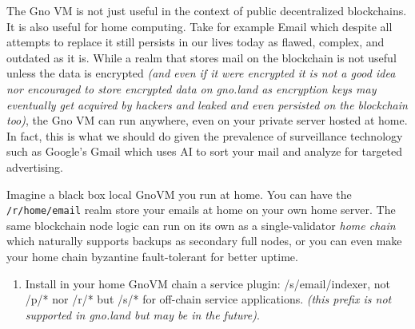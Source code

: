 \documentclass[12pt,a4paper]{article}
\providecommand{\tightlist}{\setlength{\itemsep}{0pt}\setlength{\parskip}{0pt}}
\newcommand{\passthrough}[1]{#1}
\begin{document}
The Gno VM is not just useful in the context of public decentralized
blockchains. It is also useful for home computing. Take for example
Email which despite all attempts to replace it still persists in our
lives today as flawed, complex, and outdated as it is. While a realm
that stores mail on the blockchain is not useful unless the data is
encrypted \emph{(and even if it were encrypted it is not a good idea nor
encouraged to store encrypted data on gno.land as encryption keys may
eventually get acquired by hackers and leaked and even persisted on the
blockchain too)}, the Gno VM can run anywhere, even on your private
server hosted at home. In fact, this is what we should do given the
prevalence of surveillance technology such as Google's Gmail which uses
AI to sort your mail and analyze for targeted advertising.

Imagine a black box local GnoVM you run at home. You can have the
\passthrough{\lstinline!/r/home/email!} realm store your emails at home
on your own home server. The same blockchain node logic can run on its
own as a single-validator \emph{home chain} which naturally supports
backups as secondary full nodes, or you can even make your home chain
byzantine fault-tolerant for better uptime.

\begin{enumerate}
\def\labelenumi{\arabic{enumi}.}
\tightlist
\item
  Install in your home GnoVM chain a service plugin: /s/email/indexer,
  not /p/* nor /r/* but /s/* for off-chain service applications.
  \emph{(this prefix is not supported in gno.land but may be in the
  future)}.
\end{enumerate}
\end{document}
